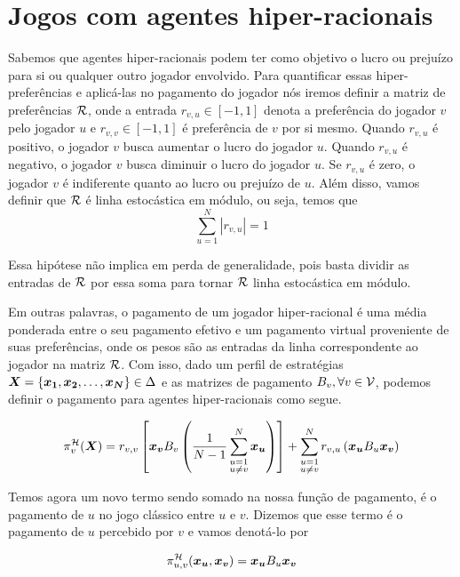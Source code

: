 \chapter{Jogos com agentes hiper-racionais}

Sabemos que agentes hiper-racionais podem ter como objetivo o lucro ou prejuízo para si ou qualquer outro jogador envolvido. Para quantificar essas hiper-preferências e aplicá-las no pagamento do jogador nós iremos definir a matriz de preferências $\mathcal{R}$, onde a entrada $r_{v,u}\in[-1,1]$ denota a preferência do jogador $v$ pelo jogador $u$ e $r_{v,v}\in[-1,1]$ é preferência de $v$ por si mesmo. Quando $r_{v,u}$ é positivo, o jogador $v$ busca aumentar o lucro do jogador $u$. Quando $r_{v,u}$ é negativo, o jogador $v$ busca diminuir o lucro do jogador $u$. Se $r_{v,u}$ é zero, o jogador $v$ é indiferente quanto ao lucro ou prejuízo de $u$. Além disso, vamos definir que $\mathcal{R}$ é linha estocástica em módulo, ou seja, temos que
\begin{equation}
    \sum_{u=1}^N |r_{v,u}| = 1
\end{equation}

Essa hipótese não implica em perda de generalidade, pois basta dividir as entradas de $\mathcal{R}$ por essa soma para tornar $\mathcal{R}$ linha estocástica em módulo.

Em outras palavras, o pagamento de um jogador hiper-racional é uma média ponderada entre o seu pagamento efetivo e um pagamento virtual proveniente de suas preferências, onde os pesos são as entradas da linha correspondente ao jogador na matriz $\mathcal{R}$. Com isso, dado um perfil de estratégias $\boldsymbol{X}=\{\boldsymbol{x_1},\boldsymbol{x_2},\dots,\boldsymbol{x_N}\}\in\Delta$ e as matrizes de pagamento $B_v,\forall v\in\mathcal{V}$, podemos definir o pagamento para agentes hiper-racionais como segue.

\begin{equation}
    \label{defPgtoHR}
    \pi^{\mathcal{H}}_v(\boldsymbol{X})=r_{v,v}\left[\boldsymbol{x_v} B_v \left(\frac{1}{N-1}\sum_{\substack{u=1\\u\neq v}}^N \boldsymbol{x_u}\right)\right] + \sum_{\substack{u=1\\u\neq v}}^N r_{v,u} \left(\boldsymbol{x_u} B_u \boldsymbol{x_v}\right)
\end{equation}

Temos agora um novo termo sendo somado na nossa função de pagamento, é o pagamento de $u$ no jogo clássico entre $u$ e $v$. Dizemos que esse termo é o pagamento de $u$ percebido por $v$ e vamos denotá-lo por

\begin{equation}
    \label{defPgtoPercebido}
    \pi^{\mathcal{H}}_{u,v}(\boldsymbol{x_u},\boldsymbol{x_v}) = \boldsymbol{x_u} B_u \boldsymbol{x_v}
\end{equation}

